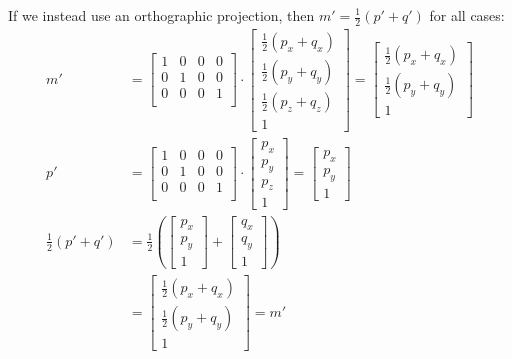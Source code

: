 \documentclass{article} %
\begin{document}
If we instead use an orthographic projection, then $m' = \frac{1}{2}(p'+q')$ for all cases:
\begin{align*}
m' &= 
\left[
\begin{matrix}
1 & 0 & 0 & 0\\
0 & 1 & 0 & 0\\
0 & 0 & 0 & 1\\
\end{matrix}
\right]
\cdot
\left[\begin{matrix}
\frac{1}{2}(p_x + q_x)\\
\frac{1}{2}(p_y + q_y)\\
\frac{1}{2}(p_z + q_z)\\
1
\end{matrix}
\right]
= 
\left[\begin{matrix}
\frac{1}{2}(p_x + q_x)\\
\frac{1}{2}(p_y + q_y)\\
1
\end{matrix}
\right]\\
p' &= 
\left[
\begin{matrix}
1 & 0 & 0 & 0\\
0 & 1 & 0 & 0\\
0 & 0 & 0 & 1\\
\end{matrix}
\right]
\cdot
\left[\begin{matrix}
p_x\\
p_y\\
p_z\\
1
\end{matrix}
\right] = \left[\begin{matrix}
p_x\\
p_y\\
1
\end{matrix}
\right]\\
\frac{1}{2}\left(p' + q'\right) &=
\frac{1}{2}
\left(
\left[\begin{matrix}
p_x\\
p_y\\
1
\end{matrix}
\right]
+
\left[\begin{matrix}
q_x\\
q_y\\
1
\end{matrix}
\right]
\right)\\
&=
\left[\begin{matrix}
\frac{1}{2}(p_x + q_x)\\
\frac{1}{2}(p_y + q_y)\\
1
\end{matrix}
\right]= m'
\end{align*}
\end{document}
